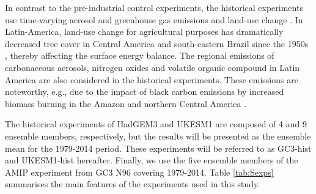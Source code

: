 In contrast to the pre-industrial control experiments, the historical experiments use  time-varying aerosol and greenhouse gas emissions and land-use change \citep{eyring2016}. In Latin-America, land-use change for agricultural purposes has dramatically decreased tree cover in Central America and south-eastern Brazil since the 1950s \citep{lawrence2012}, thereby affecting the surface energy balance. %
The regional emissions of carbonaceous aerosols, nitrogen oxides and volatile organic compound in Latin America are also considered in the historical experiments. These emissions are noteworthy, e.g., due to the impact of black carbon emissions by increased biomass burning in the Amazon and northern Central America \citep{chuvieco2008}.  

The historical experiments of HadGEM3 and UKESM1 are composed of 4 and 9 ensemble members, respectively, but the results will be presented as the ensemble mean for the 1979-2014 period. %
These experiments will be referred to as GC3-hist and UKESM1-hist hereafter.
{\color{blue}Finally, we use the five ensemble members of the AMIP experiment from GC3 N96 covering 1979-2014. Table \ref{tab:Sexps} summarises the main features of the experiments used in this study. }